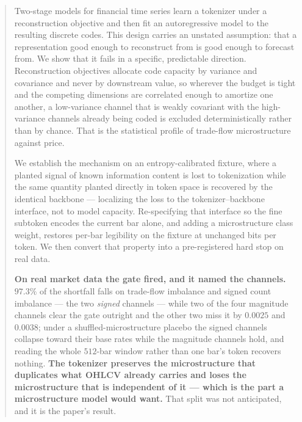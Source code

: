 \documentclass[10pt]{article}
\begin{document}
\begin{abstract}
Two-stage models for financial time series learn a tokenizer under a reconstruction objective and
then fit an autoregressive model to the resulting discrete codes. This design carries an unstated
assumption: that a representation good enough to reconstruct from is good enough to forecast from.
We show that it fails in a specific, predictable direction. Reconstruction objectives allocate code
capacity by variance and covariance and never by downstream value, so wherever the budget is tight
and the competing dimensions are correlated enough to amortize one another, a low-variance channel
that is weakly covariant with the high-variance channels already being coded is excluded
deterministically rather than by chance. That is
the statistical profile of trade-flow microstructure against price.

We establish the mechanism on an entropy-calibrated fixture, where a planted signal of known
information content is lost to tokenization while the same quantity planted directly in token space
is recovered by the identical backbone --- localizing the loss to the tokenizer--backbone
interface, not to model capacity. Re-specifying that interface so the fine subtoken encodes the
current bar alone, and adding a microstructure class weight, restores per-bar legibility on the
fixture at unchanged bits per token. We then convert that property into a pre-registered hard stop
on real data.

\textbf{On real market data the gate fired, and it named the channels.} $97.3\%$ of the shortfall
falls on trade-flow imbalance and signed count imbalance --- the two \emph{signed} channels ---
while two of the four magnitude channels clear the gate outright and the other two miss it by
$0.0025$ and $0.0038$; under a shuffled-microstructure placebo the signed channels collapse toward
their base rates while the magnitude channels hold, and reading the whole $512$-bar window rather
than one bar's token recovers nothing. \textbf{The tokenizer preserves the microstructure that
duplicates what OHLCV already carries and loses the microstructure that is independent of it ---
which is the part a microstructure model would want.} That split was not anticipated, and it is
the paper's result.


\end{abstract}
\end{document}
